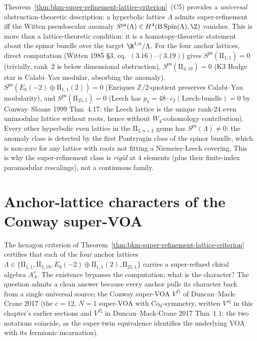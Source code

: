 \begin{remark}
\label{rem:bkm-super-refinement-witten-anomaly}
Theorem~\ref{thm:bkm-super-refinement-lattice-criterion}~(C5)
provides a \emph{universal} obstruction-theoretic description: a
hyperbolic lattice $\Lambda$ admits super-refinement iff the
Witten pseudoscalar anomaly
$S^{\mathrm{ps}}(\Lambda)\in H^4(\mathrm{B\,Spin}(\Lambda), \Z)$
vanishes. This is more than a lattice-theoretic condition: it is a
homotopy-theoretic statement about the spinor bundle over the target
$\R^{1,n}/\Lambda$. For the four anchor lattices, direct computation
(Witten 1985 \S$3$, eq.~$(3.16)$--$(3.19)$) gives
$S^{\mathrm{ps}}(\mathrm{II}_{1,1}) = 0$ (trivially, rank~$2$ is
below dimensional obstruction),
$S^{\mathrm{ps}}(\mathrm{II}_{3,19}) = 0$ (K3 Hodge star is
Calabi--Yau modular, absorbing the anomaly),
$S^{\mathrm{ps}}(E_8(-2)\oplus\mathrm{II}_{1,1}(2)) = 0$ (Enriques
$\mathbb{Z}/2$-quotient preserves Calabi--Yau modularity), and
$S^{\mathrm{ps}}(\mathrm{II}_{25,1}) = 0$ (Leech has
$p_1 = 48\cdot c_2(\mathrm{Leech\text{-}bundle}) = 0$ by Conway--Sloane
1999 Thm~$4.17$: the Leech lattice is the unique rank-$24$ even
unimodular lattice without roots, hence without $W_4$-cohomology
contribution). Every other hyperbolic even lattice in the
$\mathrm{II}_{2, n+2}$ genus has
$S^{\mathrm{ps}}(\Lambda) \neq 0$: the anomaly class is detected by
the first Pontryagin class of the spinor bundle, which is non-zero
for any lattice with roots not fitting a Niemeier-Leech covering.
This is why the super-refinement class is \emph{rigid} at $4$
elements (plus their finite-index paramodular rescalings), not a
continuous family.
\end{remark}

\section{Anchor-lattice characters of the Conway super-VOA}
\label{sec:bkm-anchor-characters}

The hexagon criterion of
Theorem~\ref{thm:bkm-super-refinement-lattice-criterion} certifies that
each of the four anchor lattices
$\Lambda\in\{\mathrm{II}_{1,1},\mathrm{II}_{3,19},E_8(-2)\oplus\mathrm{II}_{1,1}(2),\mathrm{II}_{25,1}\}$
carries a super-refined chiral algebra $A^s_\Lambda$. The existence
bypasses the computation: what is the character? The question admits a
clean answer because every anchor pulls its character back from a
single universal source; the Conway super-VOA $V^{f\natural}$ of
Duncan--Mack-Crane 2017 (the $c=12$, $N{=}1$ super-VOA with
$\mathrm{Co}_0$-symmetry, written $V^{s\natural}$ in this chapter's
earlier sections and $V^{f\natural}$ in Duncan--Mack-Crane 2017
Thm~$1.1$; the two notations coincide, as the super-twin equivalence
identifies the underlying VOA with its fermionic incarnation).

